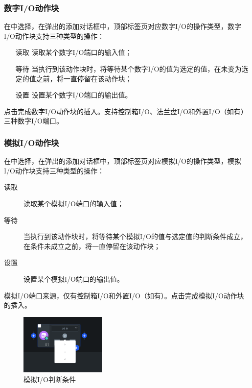 \subsubsection{数字I/O动作块}
在中选择，在弹出的添加对话框中，顶部标签页对应数字I/O的操作类型，数字I/O动作块支持三种类型的操作：
\begin{itemize}
\item[读取] 读取某个数字I/O端口的输入值；
\item[等待] 当执行到该动作块时，将等待某个数字I/O的值为选定的值，在未变为选定的值之前，将一直停留在该动作块；
\item[设置] 设置某个数字I/O端口的输出值。
\end{itemize}

点击完成数字I/O动作块的插入。支持控制箱I/O、法兰盘I/O和外置I/O（如有）三种数字I/O端口。


\subsubsection{模拟I/O动作块}
在中选择，在弹出的添加对话框中，顶部标签页对应模拟I/O的操作类型，模拟I/O动作块支持三种类型的操作：
\begin{description}
\item[读取] 读取某个模拟I/O端口的输入值；
\item[等待] 当执行到该动作块时，将等待某个模拟I/O的值与选定值的判断条件成立，在条件未成立之前，将一直停留在该动作块；
\item[设置] 设置某个模拟I/O端口的输出值。
\end{description}


模拟I/O端口来源，仅有控制箱I/O和外置I/O（如有）。点击完成模拟I/O动作块的插入。

\begin{figure}[ht]
	\centering
	\includegraphics[height=3cm]{screen/3-13.png}
	\caption{模拟I/O判断条件}
	\label{fig:模拟IO判断条件}
\end{figure}

